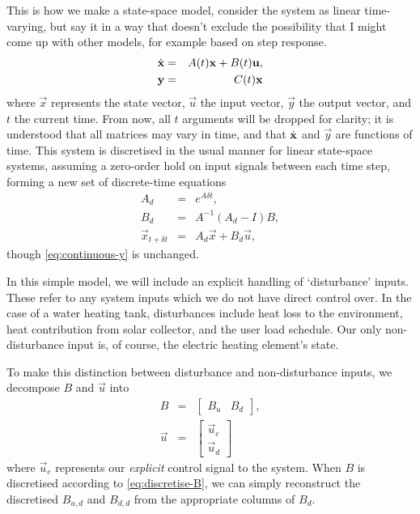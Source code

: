 This is how we make a state-space model, consider the system as linear time-varying, but say it in a way that doesn't exclude the possibility that I might come up with other models, for example based on step response.
\begin{eqnarray}
   \label{eq:continuous-xdot}
   \dot{\mathbf{x}} &=& A(t) \mathbf{x} + B(t) \mathbf{u}, \\
   \label{eq:continuous-y}
   \mathbf{y} &=& C(t) \mathbf{x}
\end{eqnarray}
where $\vec{x}$ represents the state vector, $\vec{u}$ the input vector, $\vec{y}$ the output vector, and $t$ the current time.
From now, all $t$ arguments will be dropped for clarity; it is understood that all matrices may vary in time, and that $\dot{\mathbf{x}}$ and $\vec{y}$ are functions of time.
This system is discretised in the usual manner for linear state-space systems, assuming a zero-order hold on input signals between each time step, forming a new set of discrete-time equations
\begin{eqnarray}
   \label{eq:discretise-A}
   A_d &=& e^{A \delta t}, \\
   \label{eq:discretise-B}
   B_d &=& A^{-1} (A_d - I) B, \\
   \label{eq:discrete-xdot}
   \vec{x}_{t + \delta t} &=& A_d \vec{x} + B_d \vec{u},
\end{eqnarray}
though \autoref{eq:continuous-y} is unchanged.

In this simple model, we will include an explicit handling of `disturbance' inputs.
These refer to any system inputs which we do not have direct control over.
In the case of a water heating tank, disturbances include heat loss to the environment, heat contribution from solar collector, and the user load schedule.
Our only non-disturbance input is, of course, the electric heating element's state.

To make this distinction between disturbance and non-disturbance inputs, we decompose $B$ and $\vec{u}$ into
\begin{eqnarray}
   B &=& \left[\begin{array}{cc}
      B_u & B_d
   \end{array}\right], \\
   \vec{u} &=& \left[\begin{array}{c}
      \vec{u}_e \\ \vec{u}_d
   \end{array}\right]
\end{eqnarray}
where $\vec{u}_e$ represents our \emph{explicit} control signal to the system.
When $B$ is discretised according to \autoref{eq:discretise-B}, we can simply reconstruct the discretised $B_{u, d}$ and $B_{d, d}$ from the appropriate columns of $B_d$.

